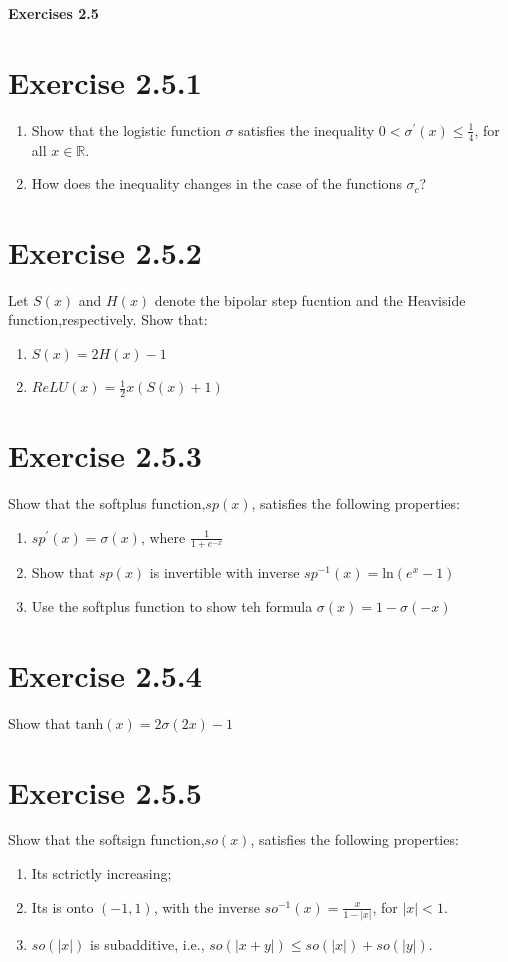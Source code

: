 \documentclass{exam}
\begin{document}
\begin{center}
    \textbf{\Large Exercises 2.5}    
\end{center}

\section*{Exercise 2.5.1}
\begin{enumerate}
    \item Show that the logistic function $\sigma$ satisfies the inequality $ 0 < \sigma^{\prime}(x) \leq \frac{1}{4}$, for all $x \in \mathbb{R}$.
    \item How does the inequality changes in the case of the functions $\sigma_{c}$?
\end{enumerate}  

\section*{Exercise 2.5.2}
Let $S(x)$ and $H(x)$ denote the bipolar step fucntion and the Heaviside function,respectively. Show that: \\
\begin{enumerate}
    \item $S(x) = 2H(x) - 1 $
    \item $ReLU(x) = \frac{1}{2}x(S(x) + 1)$
\end{enumerate}
\section*{Exercise 2.5.3}
Show that the softplus function,$sp(x)$, satisfies the following properties:
\begin{enumerate}
    \item $sp^\prime(x) = \sigma(x)\text{, where } \frac{1}{1 + e^{-x}}$
    \item Show that $sp(x)$ is invertible with inverse $sp^{-1}(x) = \text{ln}(e^x - 1)$
    \item Use the softplus function to show teh formula $\sigma(x) = 1 - \sigma(-x)$
\end{enumerate}

\section*{Exercise 2.5.4}
Show that $\text{tanh}(x) = 2\sigma(2x) - 1 $

\section*{Exercise 2.5.5}
Show that the softsign function,$so(x)$, satisfies the following properties:
\begin{enumerate}
    \item Its sctrictly increasing;
    \item Its is onto $(-1,1)$, with the inverse $so^{-1}(x) = \frac{x}{1 - |x|}$, for $|x| < 1$.
    \item $so(|x|)$ is subadditive, i.e., $so(|x+y|) \leq so(|x|) + so(|y|)$. 
\end{enumerate}
\end{document}
